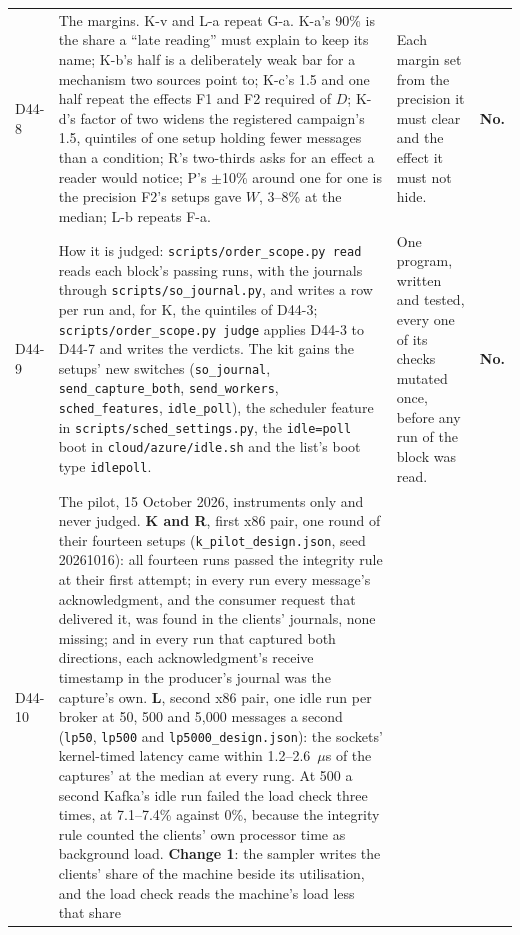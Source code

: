 \documentclass[11pt]{article}
\begin{document}
{\begin{longtable}{@{}p{1.1cm} >{\raggedright\arraybackslash}p{6.1cm} >{\raggedright\arraybackslash}p{6.0cm} >{\raggedright\arraybackslash}p{2.2cm}@{}}
D44-8 & The margins. K-v and L-a repeat G-a. K-a's 90\% is the share a ``late reading'' must explain to keep its name; K-b's half is a deliberately weak bar for a mechanism two sources point to; K-c's 1.5 and one half repeat the effects F1 and F2 required of $D$; K-d's factor of two widens the registered campaign's 1.5, quintiles of one setup holding fewer messages than a condition; R's two-thirds asks for an effect a reader would notice; P's $\pm$10\% around one for one is the precision F2's setups gave $W$, 3--8\% at the median; L-b repeats F-a. & Each margin set from the precision it must clear and the effect it must not hide. & \textbf{No.} \\
D44-9 & How it is judged: \texttt{scripts/order\_scope.py read} reads each block's passing runs, with the journals through \texttt{scripts/so\_journal.py}, and writes a row per run and, for K, the quintiles of D44-3; \texttt{scripts/order\_scope.py judge} applies D44-3 to D44-7 and writes the verdicts. The kit gains the setups' new switches (\texttt{so\_journal}, \texttt{send\_capture\_both}, \texttt{send\_workers}, \texttt{sched\_features}, \texttt{idle\_poll}), the scheduler feature in \texttt{scripts/sched\_settings.py}, the \texttt{idle=poll} boot in \texttt{cloud/azure/idle.sh} and the list's boot type \texttt{idlepoll}. & One program, written and tested, every one of its checks mutated once, before any run of the block was read. & \textbf{No.} \\
D44-10 & The pilot, 15 October 2026, instruments only and never judged. \textbf{K and R}, first x86 pair,
one round of their fourteen setups (\texttt{k\_pilot\_design.json}, seed 20261016): all fourteen
runs passed the integrity rule at their first attempt; in every run every message's
acknowledgment, and the consumer request that delivered it, was found in the clients' journals,
none missing; and in every run that captured both directions, each acknowledgment's receive
timestamp in the producer's journal was the capture's own. \textbf{L}, second x86 pair, one idle
run per broker at 50, 500 and 5,000 messages a second (\texttt{lp50}, \texttt{lp500} and
\texttt{lp5000\_design.json}): the sockets' kernel-timed latency came within 1.2--2.6~$\mu$s of the
captures' at the median at every rung. At 500 a second Kafka's idle run failed the load check three
times, at 7.1--7.4\% against 0\%, because the integrity rule counted the clients' own processor
time as background load. \textbf{Change 1}: the sampler writes the clients' share of the machine
beside its utilisation, and the load check reads the machine's load less that share

\end{longtable}}
\end{document}
